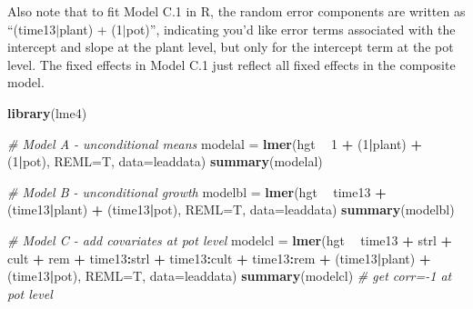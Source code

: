 \documentclass[
]{krantz}
\newenvironment{Shaded}{\begin{snugshade}}{\end{snugshade}}
\newcommand{\CommentTok}[1]{\textcolor[rgb]{0.37,0.37,0.37}{\textit{#1}}}
\newcommand{\DataTypeTok}[1]{\textcolor[rgb]{0.27,0.27,0.27}{#1}}
\newcommand{\DecValTok}[1]{\textcolor[rgb]{0.06,0.06,0.06}{#1}}
\newcommand{\KeywordTok}[1]{\textcolor[rgb]{0.27,0.27,0.27}{\textbf{#1}}}
\newcommand{\NormalTok}[1]{#1}
\newcommand{\OperatorTok}[1]{\textcolor[rgb]{0.43,0.43,0.43}{\textbf{#1}}}
\newcommand{\StringTok}[1]{\textcolor[rgb]{0.5,0.5,0.5}{#1}}
\begin{document}
Also note that to fit Model C.1 in R, the random error components are written as ``(time13\(|\)plant) + (1\(|\)pot)'', indicating you'd like error terms associated with the intercept and slope at the plant level, but only for the intercept term at the pot level. The fixed effects in Model C.1 just reflect all fixed effects in the composite model.

\begin{Shaded}
\begin{Highlighting}[]
\KeywordTok{library}\NormalTok{(lme4)}

\CommentTok{# Model A - unconditional means}
\NormalTok{modelal =}\StringTok{ }\KeywordTok{lmer}\NormalTok{(hgt }\OperatorTok{~}\StringTok{ }\DecValTok{1} \OperatorTok{+}\StringTok{ }\NormalTok{(}\DecValTok{1}\OperatorTok{|}\NormalTok{plant) }\OperatorTok{+}\StringTok{ }\NormalTok{(}\DecValTok{1}\OperatorTok{|}\NormalTok{pot), }\DataTypeTok{REML=}\NormalTok{T, }\DataTypeTok{data=}\NormalTok{leaddata)}
\KeywordTok{summary}\NormalTok{(modelal)}

\CommentTok{# Model B - unconditional growth}
\NormalTok{modelbl =}\StringTok{ }\KeywordTok{lmer}\NormalTok{(hgt }\OperatorTok{~}\StringTok{ }\NormalTok{time13 }\OperatorTok{+}\StringTok{ }\NormalTok{(time13}\OperatorTok{|}\NormalTok{plant) }\OperatorTok{+}\StringTok{ }\NormalTok{(time13}\OperatorTok{|}\NormalTok{pot),}
  \DataTypeTok{REML=}\NormalTok{T, }\DataTypeTok{data=}\NormalTok{leaddata)}
\KeywordTok{summary}\NormalTok{(modelbl)}

\CommentTok{# Model C - add covariates at pot level}
\NormalTok{modelcl =}\StringTok{ }\KeywordTok{lmer}\NormalTok{(hgt }\OperatorTok{~}\StringTok{ }\NormalTok{time13 }\OperatorTok{+}\StringTok{ }\NormalTok{strl }\OperatorTok{+}\StringTok{ }\NormalTok{cult }\OperatorTok{+}\StringTok{ }\NormalTok{rem }\OperatorTok{+}\StringTok{ }\NormalTok{time13}\OperatorTok{:}\NormalTok{strl }\OperatorTok{+}
\StringTok{  }\NormalTok{time13}\OperatorTok{:}\NormalTok{cult }\OperatorTok{+}\StringTok{ }\NormalTok{time13}\OperatorTok{:}\NormalTok{rem }\OperatorTok{+}\StringTok{ }\NormalTok{(time13}\OperatorTok{|}\NormalTok{plant) }\OperatorTok{+}\StringTok{ }\NormalTok{(time13}\OperatorTok{|}\NormalTok{pot),}
  \DataTypeTok{REML=}\NormalTok{T, }\DataTypeTok{data=}\NormalTok{leaddata)}
\KeywordTok{summary}\NormalTok{(modelcl)   }\CommentTok{# get corr=-1 at pot level}


\end{Highlighting}
\end{Shaded}
\end{document}
